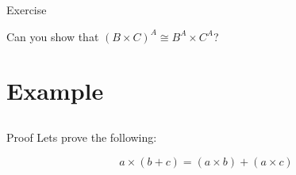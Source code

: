 \documentclass[tikz]{beamer}
\theoremstyle{definition}
\begin{document}
\begin{frame}{Exercise}

Can you show that $(B \times C)^A \cong B^A \times C^A$?
\end{frame}

\section{Example}
\subsection{}

\begin{frame}{Proof}
    Lets prove the following:

    \begin{center}
        \begin{equation*}
            a \times (b + c) = (a \times b) + (a \times c)
        \end{equation*}
    \end{center}

\end{frame}
\end{document}
